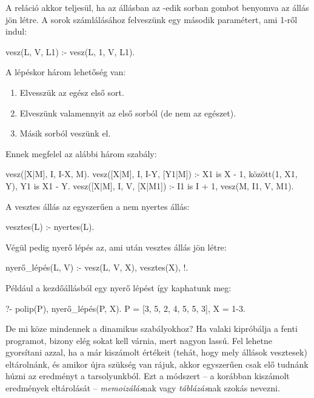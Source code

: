 A  reláció akkor teljesül, ha az  állásban
az -edik sorban  gombot benyomva az  állás jön létre.
A sorok számlálásához felveszünk egy második paramétert, ami 1-ről indul:
\begin{program}
vesz(L, V, L1) :- vesz(L, 1, V, L1).
\end{program}
A lépéskor három lehetőség van:
\begin{enumerate}
\item Elvesszük az egész első sort.
\item Elveszünk valamennyit az első sorból (de nem az egészet).
\item Másik sorból veszünk el.
\end{enumerate}
Ennek megfelel az alábbi három szabály:
\begin{program}
vesz([X|M], I, I-X, M).
vesz([X|M], I, I-Y, [Y1|M]) :-
    X1 is X - 1, között(1, X1, Y), Y1 is X1 - Y.
vesz([X|M], I, V, [X|M1]) :-
    I1 is I + 1, vesz(M, I1, V, M1).
\end{program}

A vesztes állás az egyszerűen a nem nyertes állás:
\begin{program}
vesztes(L) :- \+ nyertes(L).
\end{program}

Végül pedig nyerő lépés az, ami után vesztes állás jön létre:
\begin{program}
nyerő_lépés(L, V) :- vesz(L, V, X), vesztes(X), !.
\end{program}

Például a kezdőállásból egy nyerő lépést így kaphatunk meg:
\begin{query}
?- polip(P), nyerő_lépés(P, X).
P = [3, 5, 2, 4, 5, 5, 3],
X = 1-3. %
\end{query}

De mi köze mindennek a dinamikus szabályokhoz?
Ha valaki kipróbálja a fenti programot, bizony elég sokat kell várnia,
mert nagyon lassú. Fel lehetne gyorsítani azzal, ha a 
már kiszámolt értékeit (tehát, hogy mely állások vesztesek) eltárolnánk,
és amikor újra szükség van rájuk, akkor egyszerűen csak elő tudnánk húzni
az eredményt a tarsolyunkból. Ezt a módszert -- a korábban kiszámolt
eredmények eltárolását -- \emph{memoizálás}\/nak vagy \emph{táblázás}\/nak
szokás nevezni.

